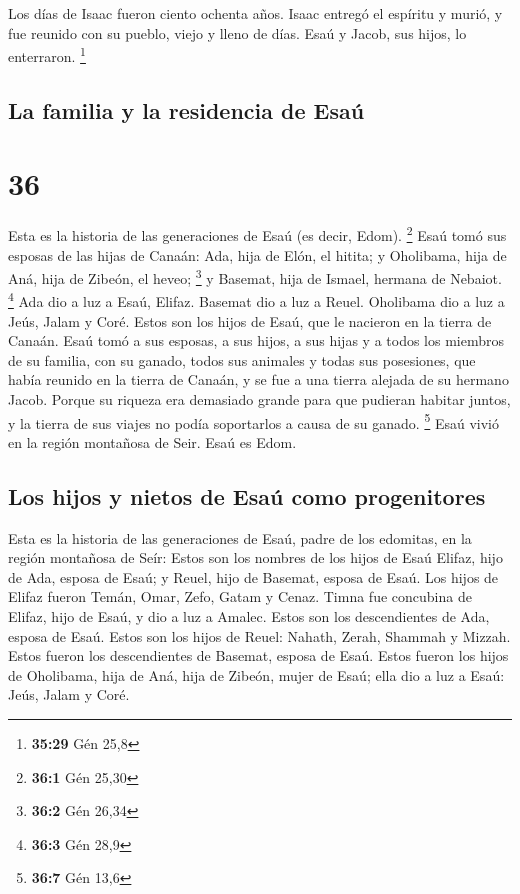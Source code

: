  Los días de Isaac fueron ciento ochenta años.
 Isaac entregó el espíritu y murió, y fue reunido con su
pueblo, viejo y lleno de días. Esaú y Jacob, sus hijos, lo enterraron.
\footnote{\textbf{35:29} Gén 25,8}

\hypertarget{la-familia-y-la-residencia-de-esauxfa}{%
\subsection{La familia y la residencia de
Esaú}\label{la-familia-y-la-residencia-de-esauxfa}}

\hypertarget{section-35}{%
\section{36}\label{section-35}}

 Esta es la historia de las generaciones de Esaú (es
decir, Edom). \footnote{\textbf{36:1} Gén 25,30}  Esaú
tomó sus esposas de las hijas de Canaán: Ada, hija de Elón, el hitita; y
Oholibama, hija de Aná, hija de Zibeón, el heveo; \footnote{\textbf{36:2}
  Gén 26,34}  y Basemat, hija de Ismael, hermana de
Nebaiot. \footnote{\textbf{36:3} Gén 28,9}  Ada dio a luz
a Esaú, Elifaz. Basemat dio a luz a Reuel.  Oholibama dio
a luz a Jeús, Jalam y Coré. Estos son los hijos de Esaú, que le nacieron
en la tierra de Canaán.  Esaú tomó a sus esposas, a sus
hijos, a sus hijas y a todos los miembros de su familia, con su ganado,
todos sus animales y todas sus posesiones, que había reunido en la
tierra de Canaán, y se fue a una tierra alejada de su hermano Jacob.
 Porque su riqueza era demasiado grande para que pudieran
habitar juntos, y la tierra de sus viajes no podía soportarlos a causa
de su ganado. \footnote{\textbf{36:7} Gén 13,6}  Esaú
vivió en la región montañosa de Seir. Esaú es Edom.

\hypertarget{los-hijos-y-nietos-de-esauxfa-como-progenitores}{%
\subsection{Los hijos y nietos de Esaú como
progenitores}\label{los-hijos-y-nietos-de-esauxfa-como-progenitores}}

 Esta es la historia de las generaciones de Esaú, padre de
los edomitas, en la región montañosa de Seír:  Estos son
los nombres de los hijos de Esaú Elifaz, hijo de Ada, esposa de Esaú; y
Reuel, hijo de Basemat, esposa de Esaú.  Los hijos de
Elifaz fueron Temán, Omar, Zefo, Gatam y Cenaz.  Timna
fue concubina de Elifaz, hijo de Esaú, y dio a luz a Amalec. Estos son
los descendientes de Ada, esposa de Esaú.  Estos son los
hijos de Reuel: Nahath, Zerah, Shammah y Mizzah. Estos fueron los
descendientes de Basemat, esposa de Esaú.  Estos fueron
los hijos de Oholibama, hija de Aná, hija de Zibeón, mujer de Esaú; ella
dio a luz a Esaú: Jeús, Jalam y Coré.

